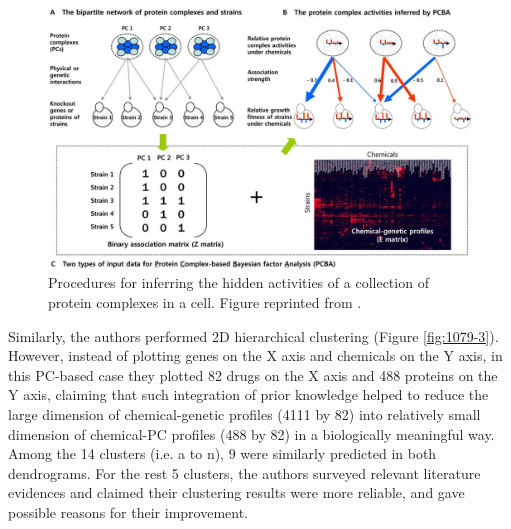\documentclass[12pt,fullpage,singlespace]{article}
\begin{document}
\begin{figure}
\centering
\includegraphics[width=\linewidth]{1079-2.png}
\caption{Procedures for inferring the hidden activities of a collection of protein complexes in a cell. Figure reprinted from \citep{1079}.}
\label{fig:1079-2}
\end{figure}

Similarly, the authors performed 2D hierarchical clustering (Figure \ref{fig:1079-3}). However, instead of plotting genes on the X axis and chemicals on the Y axis, in this PC-based case they plotted 82 drugs on the X axis and 488 proteins on the Y axis, claiming that such integration of prior knowledge helped to reduce the large dimension of chemical-genetic profiles (4111 by 82) into relatively small dimension of chemical-PC profiles (488 by 82) in a biologically meaningful way. Among the 14 clusters (i.e. a to n), 9 were similarly predicted in both dendrograms. For the rest 5 clusters, the authors surveyed relevant literature evidences and claimed their clustering results were more reliable, and gave possible reasons for their improvement.
\end{document}
